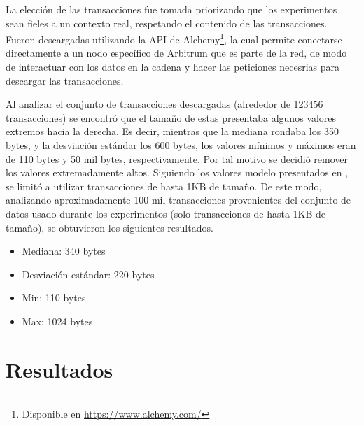 La elección de las transacciones fue tomada priorizando que los experimentos sean fieles a un contexto
real, respetando el contenido de las transacciones.
%
Fueron descargadas utilizando la API de Alchemy\footnote{Disponible en \url{https://www.alchemy.com/}}, la
cual permite conectarse directamente a un nodo específico de Arbitrum que es parte de la red,
de modo de interactuar con los datos en la cadena y hacer las peticiones necesrias para descargar las transacciones.

%
Al analizar el conjunto de transacciones descargadas (alrededor de 123456 transacciones) se encontró que el tamaño de
estas presentaba algunos valores extremos hacia la derecha.
Es decir, mientras que la mediana rondaba los 350 bytes, y la desviación estándar los 600 bytes, los valores mínimos y máximos eran de
110 bytes y  50 mil bytes, respectivamente.
Por tal motivo se decidió remover los valores extremadamente altos.
Siguiendo los valores modelo presentados en \cite{tendermint.design}, se limitó a utilizar transacciones de hasta 1KB de tamaño.
De este modo, analizando aproximadamente 100 mil transacciones provenientes del conjunto de datos usado
durante los experimentos (solo transacciones de hasta 1KB de tamaño), se obtuvieron los siguientes resultados.
\begin{itemize}
	\item Mediana: 340 bytes
	\item Desviación estándar: 220 bytes
	\item Min: 110 bytes
	\item Max: 1024 bytes
\end{itemize}
%

\section{Resultados}



